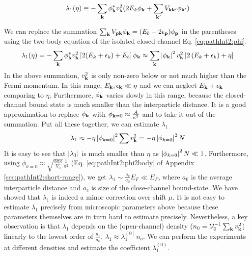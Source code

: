 \begin{equation*}
\lambda_{1}(\eta)\equiv-\sum_{\mathbf{k}}{\phi_{\mathbf{k}}^{*}}v_{\mathbf{k}}^{2}(2E_{k}\phi_{\mathbf{k}}+\sum_{\mathbf{k}'}V_{\mathbf{k}\mathbf{k}'}\phi_{\mathbf{k}'})
\end{equation*}

We can replace the summation $\sum_{\mathbf{k}}V_{\mathbf{p}\mathbf{k}} \phi_{\mathbf{k}}=(E_{b}+2\epsilon_{\mathbf{p}})\phi_{\mathbf{p}}$ in the parentheses using the two-body \sch equation of the isolated closed-channel Eq. \ref{eq:pathInt2:phi}.
\begin{equation*}
\lambda_{1}(\eta)=-\sum_{\mathbf{k}}{\phi_{\mathbf{k}}^{*}}v_{\mathbf{k}}^{2}\left[2(E_{k}+\epsilon_{k})+E_b\right]\phi_{\mathbf{k}}
	\approx\sum_{\mathbf{k}}\left\lvert{\phi_{\ensuremath{\mathbf{k}}}}\right\rvert^2v_{\mathbf{k}}^{2}\left[2\left(E_{k}+\epsilon_{k}\right)+\eta\right]
\end{equation*}
In the above summation, $v_{\mathbf{k}}^2$ is only non-zero below or not much higher than the Fermi momentum.  In this range, $E_{\mathbf{k}},\epsilon_{\mathbf{k}}\ll\eta$ and we can neglect $E_{\mathbf{k}}+\epsilon_{\mathbf{k}}$ comparing to $\eta$.  
Furthermore, $\phi_{\mathbf{k}}$ varies slowly  in this range, because the closed-channel bound state is much smaller than the interparticle distance.    It is a good approximation to replace $\phi_{\mathbf{k}}$ with $\phi_{\mathbf{k}=0}\approx\frac{A}{\kappa^{2}}$ and to take it out of the summation.  
Put all these together, we can estimate $\lambda_{1}$ 
\begin{equation}
\lambda_{1}\approx-\eta\left\lvert{\phi_{k=0}}\right\rvert^2\sum{}v_{\mathbf{k}}^{2}=-\eta\left\lvert{\phi_{k=0}}\right\rvert^2N	
\end{equation}
It is easy to see that $\left\lvert{\lambda_{1}}\right\rvert$ is much smaller than $\eta$ as $\left\lvert{\phi_{k=0}}\right\rvert^2N\ll1$.  Furthermore, using $\phi_{k=0}\approx\sqrt{\frac{8\pi\kappa}{V_{0}}}\frac{1}{\kappa^{2}}$ (Eq. \ref{eq:pathInt2:phi2body} of Appendix \ref{sec:pathInt2:short-range}), we get $\lambda_{1}\sim\frac{a_{c}}{a_{0}}E_{F}\ll{}E_{F}$, where $a_{0}$ is the average interparticle distance and $a_{c}$ is size of the close-channel bound-state.   We have showed that $\lambda_{1}$ is indeed a minor correction over shift $\mu$.
It is not easy to estimate $\lambda_{1}$ precisely from  microscopic parameters above because these parameters themselves are  in turn hard to  estimate precisely.  Nevertheless, a key observation is that $\lambda_1$ depends on the (open-channel) density ($n_{0}={\mathcal{V}_{0}^{-1}}\sum_{\mathbf{k}}v_{\mathbf{k}}^2$) linearly to the lowest order of $\frac{a_{c}}{a_{0}}$, $\lambda_1\approx\lambda_1^{(0)}n_{o}$.  We can perform the experiments at different densities and estimate the coefficient $\lambda_1^{(0)}$. 


